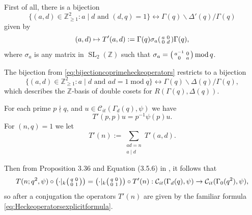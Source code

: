 \documentclass{article}
\theoremstyle{named}
\newcommand{\C}{\mathcal{C}}
\newcommand{\Z}{\mathbb{Z}}
\DeclareMathOperator{\SL}{SL}
\DeclareMathOperator{\modulo}{mod}
\begin{document}
First of all, there is a bijection
\begin{equation}\label{eq:bijectioncoprimeheckeoperators}
    \{(a, d) \in \Z^2_{\geq 1}: a \mid d \text{ and }(d, q) = 1\} \longleftrightarrow \Gamma(q)\backslash \Delta'(q)/\Gamma(q)
\end{equation}
given by
\begin{equation}\label{eq:definitiongeneralheckeoperators}
    (a, d) \mapsto T'(a, d) := \Gamma(q) \sigma_a \begin{psmallmatrix}
        a & 0\\
        0 & d
    \end{psmallmatrix}\Gamma(q),
\end{equation}
where $\sigma_a$ is any matrix in $\SL_2(\Z)$ such that $\sigma_a = \begin{psmallmatrix}
    a^{-1} & 0\\
    0 & a
\end{psmallmatrix} \modulo q$.

The bijection from \eqref{eq:bijectioncoprimeheckeoperators} restricts to a bijection 
\begin{equation*}
    \{(a, d) \in \Z^2_{\geq 1}: a \mid d \text{ and }ad = 1 \modulo q\} \longleftrightarrow \Gamma(q)\backslash \Delta(q)/\Gamma(q),
\end{equation*}
which describes the $\Z$-basis of double cosets for $R(\Gamma(q), \Delta(q))$. 

For each prime $p \nmid q$, and $u \in \C_{it}(\Gamma_d(q), \psi)$ we have 
\begin{equation}\label{eq:actionbyscalarhecke}
    T'(p, p) u = p^{-1}\psi(p) u. 
\end{equation}
For $(n, q) = 1$ we let 
\begin{equation*}
    T'(n) := \sum_{\substack{ad = n\\
    a \mid d}}T'(a, d).
\end{equation*}

Then from Proposition 3.36 and Equation (3.5.6) in \cite{shimurabook}, it follows that 
\begin{equation}\label{eq:conjugationheckeoperators}
    T(n; q^2, \psi) \circ \left(\cdot  |_k \begin{psmallmatrix}
        q & 0\\
        0 & 1
    \end{psmallmatrix}\right) = \left(\cdot |_k \begin{psmallmatrix}
        q & 0\\
        0 & 1
    \end{psmallmatrix}\right) \circ T'(n) : \C_{it}(\Gamma_d(q), \psi)\rightarrow \C_{it}(\Gamma_0(q^2), \psi),
\end{equation}
so after a conjugation the operators $T'(n)$ are given by the familiar formula \eqref{eq:Heckeoperatorsexplicitformula}.\newline
\end{document}
